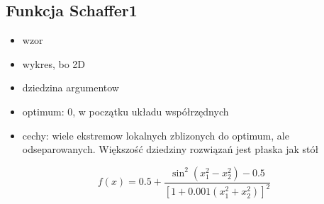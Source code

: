 \subsection{Funkcja Schaffer1}
\begin{itemize}
\item wzor
\item wykres, bo 2D
\item dziedzina argumentow
\item optimum: 0, w początku układu współrzędnych
\item cechy: wiele ekstremow lokalnych zblizonych do optimum, ale odseparowanych. Większość dziedziny rozwiązań jest płaska jak stół 
\end{itemize}

\begin{equation} \label{eq:Schaffer1}
f(x)=0.5+\frac{\sin^2(x_1^2-x_2^2)-0.5}{[1+0.001(x_1^2+x_2^2)]^2}
\end{equation}


